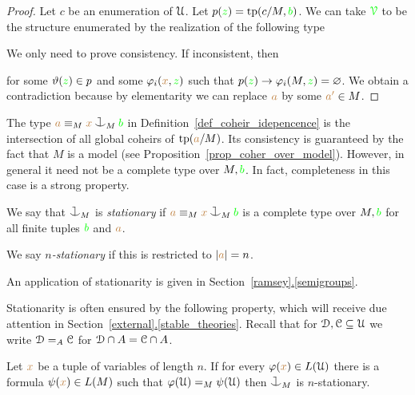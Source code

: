 \documentclass[creche.tex]{subfiles}
\begin{document}
\begin{proof}
  Let $c$ be an enumeration of $\EuScript U$.
  Let $p({\color{green} z})={\rm tp}(c/M,{\color{green} b})$.
  We can take ${\color{green}\EuScript V}$ to be the structure enumerated by the realization of the following type 


  We only need to prove consistency.
  If inconsistent, then 

  
for some $\vartheta({\color{green} z})\in p$ and some $\varphi_i({\color{brown} x},{\color{green} z})$ such that $p({\color{green} z})\rightarrow\varphi_i(M,{\color{green} z})=\varnothing$.
We obtain a contradiction because by elementarity we can replace ${\color{brown} a}$ by some ${\color{brown} a'}\in M$.
\end{proof}


The type ${\mr a}\equiv_M{\mr x}\cnonfork_M{\gr b}$ in Definition~\ref{def_coheir_idepencence} is the intersection of all global coheirs of ${\rm tp}({\color{brown} a}/M)$.
%
Its consistency is guaranteed by the fact that $M$ is a model (see Proposition~\ref{prop_coher_over_model}).
%
However, in general it need not be a complete type over $M,{\color{green} b}$.
%
In fact, completeness in this case is a strong property.

\begin{definition}\label{def_coheir_stationary} We say that $\cnonfork_M$ is \emph{stationary\/} if ${\mr a}\equiv_M{\mr x}\cnonfork_M{\gr b}$ is a complete type over $M,{\color{green} b}$ for all finite tuples ${\color{green} b}$ and ${\color{brown} a}$.

We say \emph{$n$-stationary\/} if this is restricted to $|{\color{brown} a}|=n$.\QED
\end{definition}
%
An application of stationarity is given in Section~\hyperref[stable_theories]{\ref*{ramsey}.\ref*{semigroups}}.

Stationarity is often ensured by the following property, which will receive due attention in Section~\hyperref[stable_theories]{\ref*{external}.\ref*{stable_theories}}. Recall that for $\EuScript D,\EuScript C\subseteq\EuScript U$ we write $\EuScript D=_A\EuScript C$ for $\EuScript D\cap A=\EuScript C\cap A$.

\begin{proposition}
Let ${\color{brown} x}$ be a tuple of variables of length $n$.
If for every $\varphi({\color{brown} x})\in L(\EuScript U)$ there is a formula $\psi({\color{brown} x})\in L(M)$ such that $\varphi(\EuScript U)=_M\psi(\EuScript U)$ then $\cnonfork_M$ is $n$-stationary.
\end{proposition}
\end{document}

